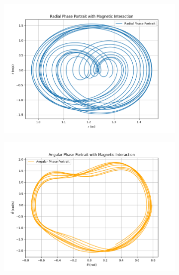 \documentclass[12pt]{article}
\begin{document}
\begin{figure}[h!]
    \centering
    \begin{subfigure}{0.28\textwidth}
        \centering
        \includegraphics[width=\textwidth]{radial_phase_portrait_magnetic.png}
        \label{fig:radial_phase_portrait}
    \end{subfigure}
    \hfill
    \begin{subfigure}{0.28\textwidth}
        \centering
        \includegraphics[width=\textwidth]{angular_phase_portrait_magnetic.png}
        \label{fig:angular_phase_portrait}
    \end{subfigure}
    \hfill
    \begin{subfigure}{0.28\textwidth}
        \centering

\end{subfigure}
\end{figure}
\end{document}
